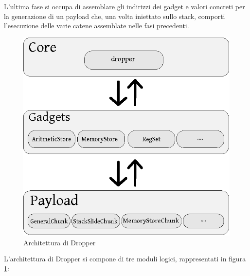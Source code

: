 L'ultima fase si occupa di assemblare gli indirizzi dei gadget e
valori concreti per la generazione di un payload che, una volta
iniettato sullo stack, comporti l'esecuzione delle varie catene
assemblate nelle fasi precedenti.


\begin{figure}
\begin{center}
\includegraphics{img_architettura}
\caption{Architettura di Dropper}
\label{fig:arch}
\end{center}
\end{figure}

L'architettura di Dropper si compone di tre moduli logici,
rappresentati in figura \ref{fig:arch}:

